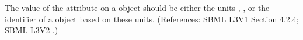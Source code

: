 The value of the attribute  on a \Model object should be
either the units , , or the identifier of a
\UnitDefinition object based on these units.  (References: SBML L3V1 Section 4.2.4; SBML L3V2
.)
